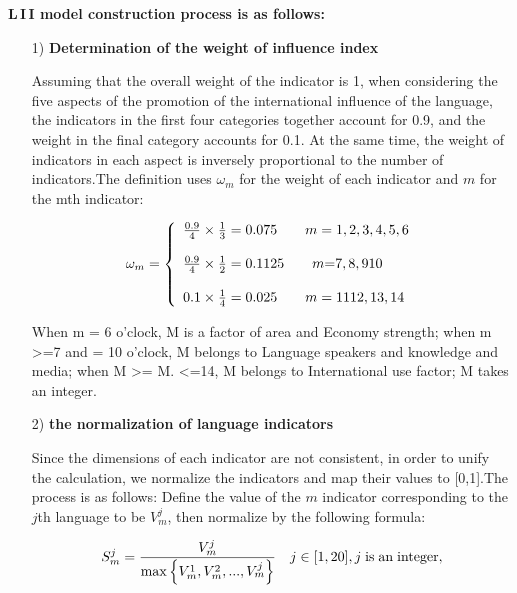 \par \textbf{L\,I\,I model construction process is as follows:}

\begin{enumerate}
	\item[1)] \textbf{Determination of the weight of influence index}
	\par Assuming that the overall weight of the indicator is 1, when considering the five aspects of the promotion of the international influence of the language, the indicators in the first four categories together account for 0.9, and the weight in the final category accounts for 0.1. At the same time, the weight of indicators in each aspect is inversely proportional to the number of indicators.The definition uses ${\omega _m}$ for the weight of each indicator and $m$ for the mth indicator:



		\begin{equation}
	{\omega _m} = \left\{ \begin{array}{l}
	\frac{{0.9}}{4} \times \frac{1}{3} = 0.075{\rm{          }} \qquad m = 1,2,3{\rm{ ,4,5,6 }}\\
	\\
	\frac{{0.9}}{4} \times \frac{1}{2} = 0.1125{\rm{        }}\qquad m{\rm{ = }}7,8,910\\
	\\
	0.1 \times \frac{1}{4} = 0.025{\rm{           }}\qquad m = 1112,13,14
	\end{array} \right.
	 \label{aa1}
		\end{equation}
		
		When m = 6 o'clock, M is a factor of area and Economy strength; when m >=7 and = 10 o'clock, M belongs to Language speakers and knowledge and media; when M >= M. <=14, M belongs to International use factor; M takes an integer. 
	
	\item[2)] \textbf{the normalization of language indicators}
	\par Since the dimensions of each indicator are not consistent, in order to unify the calculation, we normalize the indicators and map their values to [0,1].The process is as follows: Define the value of the $m$ indicator corresponding to the $j$th language to be $V_m^j$, then normalize by the following formula:
	
	\begin{equation}
	S_m^j = \frac{{V_m^j}}{{\max \left\{ {V_m^1,V_m^2,...,V_m^j} \right\}}}{\rm{        }}\quad j \in [1,20],j\;{\rm{ is\; an\; integer}}\label{aa1},
	\end{equation}
	

\end{enumerate}
